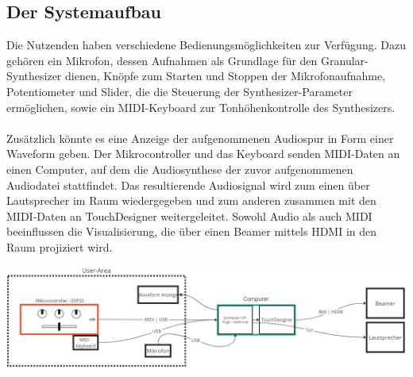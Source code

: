 \documentclass[12pt]{scrartcl}%
\theoremstyle{nonumberplain}
\begin{document}
\subsection{Der Systemaufbau}

Die Nutzenden haben verschiedene Bedienungsmöglichkeiten zur Verfügung. Dazu gehören ein Mikrofon, dessen Aufnahmen als Grundlage für den Granular-Synthesizer dienen, Knöpfe zum Starten und Stoppen der Mikrofonaufnahme, Potentiometer und Slider, die die Steuerung der Synthesizer-Parameter ermöglichen, sowie ein MIDI-Keyboard zur Tonhöhenkontrolle des Synthesizers.\\\\
Zusätzlich könnte es eine Anzeige der aufgenommenen Audiospur in Form einer Waveform geben. Der Mikrocontroller und das Keyboard senden MIDI-Daten an einen Computer, auf dem die Audiosynthese der zuvor aufgenommenen Audiodatei stattfindet. Das resultierende Audiosignal wird zum einen über Lautsprecher im Raum wiedergegeben und zum anderen zusammen mit den MIDI-Daten an TouchDesigner weitergeleitet. Sowohl Audio als auch MIDI beeinflussen die Visualisierung, die über einen Beamer mittels HDMI in den Raum projiziert wird.
\begin{center}
 \includegraphics[scale=0.43]{system_schaltbild_v1.png}
\end{center}
\newpage
\end{document}
